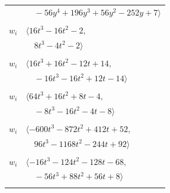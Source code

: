 \documentclass[11pt]{article}
\begin{document}
\begin{longtable}{@{}ll@{}}
 & $\quad -56y^{4}+196y^{3}+56y^{2}-252y+7\rangle$\\
\addlinespace[2pt]
\multicolumn{2}{@{}p{0.97\textwidth}@{}}{$i=43$, $D_i=2$, $\rho_{ij}$: $15{:}1, \allowbreak 23{:}2, \allowbreak 41{:}2, \allowbreak 54{:}2$}\\
$w_i$ & $\langle 16t^{3}-16t^{2}-2,$\\
 & $\quad 8t^{3}-4t^{2}-2\rangle$\\
\addlinespace[2pt]
\multicolumn{2}{@{}p{0.97\textwidth}@{}}{$i=44$, $D_i=8$, $\rho_{ij}$: $1{:}2, \allowbreak 3{:}2, \allowbreak 11{:}2, \allowbreak 19{:}1, \allowbreak 20{:}2, \allowbreak 21{:}2, \allowbreak 23{:}2, \allowbreak 26{:}1, \allowbreak 52{:}1, \allowbreak 54{:}1$}\\
$w_i$ & $\langle 16t^{3}+16t^{2}-12t+14,$\\
 & $\quad -16t^{3}-16t^{2}+12t-14\rangle$\\
\addlinespace[2pt]
\multicolumn{2}{@{}p{0.97\textwidth}@{}}{$i=45$, $D_i=8$, $\rho_{ij}$: $5{:}1, \allowbreak 11{:}2, \allowbreak 24{:}2, \allowbreak 26{:}2, \allowbreak 38{:}1, \allowbreak 41{:}2, \allowbreak 47{:}2$}\\
$w_i$ & $\langle 64t^{3}+16t^{2}+8t-4,$\\
 & $\quad -8t^{3}-16t^{2}-4t-8\rangle$\\
\addlinespace[2pt]
\multicolumn{2}{@{}p{0.97\textwidth}@{}}{$i=46$, $D_i=8$, $\rho_{ij}$: $0{:}1, \allowbreak 8{:}2, \allowbreak 10{:}1, \allowbreak 14{:}1, \allowbreak 17{:}2, \allowbreak 26{:}2, \allowbreak 28{:}1, \allowbreak 38{:}1, \allowbreak 50{:}2$}\\
$w_i$ & $\langle -600t^{3}-872t^{2}+412t+52,$\\
 & $\quad 96t^{3}-1168t^{2}-244t+92\rangle$\\
\addlinespace[2pt]
\multicolumn{2}{@{}p{0.97\textwidth}@{}}{$i=47$, $D_i=8$, $\rho_{ij}$: $0{:}2, \allowbreak 13{:}1, \allowbreak 14{:}1, \allowbreak 15{:}2, \allowbreak 17{:}2, \allowbreak 20{:}2, \allowbreak 25{:}1, \allowbreak 26{:}1, \allowbreak 32{:}1, \allowbreak 34{:}1, \allowbreak 45{:}1, \allowbreak 51{:}1$}\\
$w_i$ & $\langle -16t^{3}-124t^{2}-128t-68,$\\
 & $\quad -56t^{3}+88t^{2}+56t+8\rangle$\\
\addlinespace[2pt]
\multicolumn{2}{@{}p{0.97\textwidth}@{}}{$i=48$, $D_i=2$, $\rho_{ij}$: $17{:}1, \allowbreak 21{:}1, \allowbreak 34{:}2, \allowbreak 35{:}1, \allowbreak 52{:}2, \allowbreak 54{:}1$}\\

\end{longtable}
\end{document}
